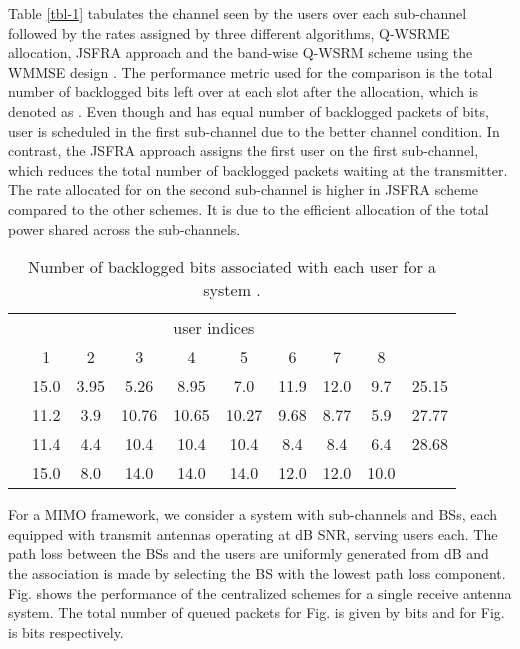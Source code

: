 Table \ref{tbl-1} tabulates the channel seen by the users over each sub-channel followed by the rates assigned by three different algorithms, \ac{Q-WSRME} allocation, \ac{JSFRA} approach and the band-wise \ac{Q-WSRM} scheme using the \ac{WMMSE} design \cite{wmmse_shi}. The performance metric used for the comparison is the total number of backlogged bits left over at each slot after the allocation, which is denoted as . Even though  and  has equal number of backlogged packets of  bits, user  is scheduled in the first sub-channel due to the better channel condition. In contrast, the \ac{JSFRA} approach assigns the first user on the first sub-channel, which reduces the total number of backlogged packets waiting at the transmitter. The rate allocated for  on the second sub-channel is higher in \ac{JSFRA} scheme compared to the other schemes. It is due to the efficient allocation of the total power shared across the sub-channels.
\begin{table}
	\centering
	\caption{Number of backlogged bits associated with each user for a system .}
	\renewcommand{\arraystretch}{1.25} \scriptsize
	\begin{tabular}{|c|*{8}{c}|c|}
		\hline
		\multirow{2}{*}{\me{q}} & \multicolumn{8}{c|}{user indices} & \multirow{2}{*}{\me{\chi}} \\
		\cline{2-9}
		& 1 & 2 & 3 & 4 & 5 & 6 & 7 & 8 & \\
		\hline
		\hline
		\me{1} & 15.0 & 3.95 & 5.26 & 8.95 & 7.0 & 11.9 & 12.0 & 9.7 & 25.15 \\
		\me{2} & 11.2 & 3.9 & 10.76 & 10.65 & 10.27 & 9.68 & 8.77 & 5.9 & 27.77 \\
		\me{\infty} & 11.4 & 4.4 & 10.4 & 10.4 & 10.4 & 8.4 &  8.4 &  6.4 & 28.68 \\
		\hline
		\me{Q_k}  & 15.0 &  8.0 &  14.0 & 14.0 &  14.0 & 12.0 & 12.0 & 10.0  \\
		\cline{1-9}
	\end{tabular}
	\label{tbl-3}
\end{table}

For a \ac{MIMO} framework, we consider a system with  sub-channels and  \acp{BS}, each equipped with  transmit antennas operating at dB \ac{SNR}, serving  users each. The path loss between the \acp{BS} and the users are uniformly generated from \me{[0,-3]} dB and the association is made by selecting the \ac{BS} with the lowest path loss component. Fig.  shows the performance of the centralized schemes for a single receive antenna system. The total number of queued packets for Fig.  is given by  bits and for Fig.  is  bits respectively.

